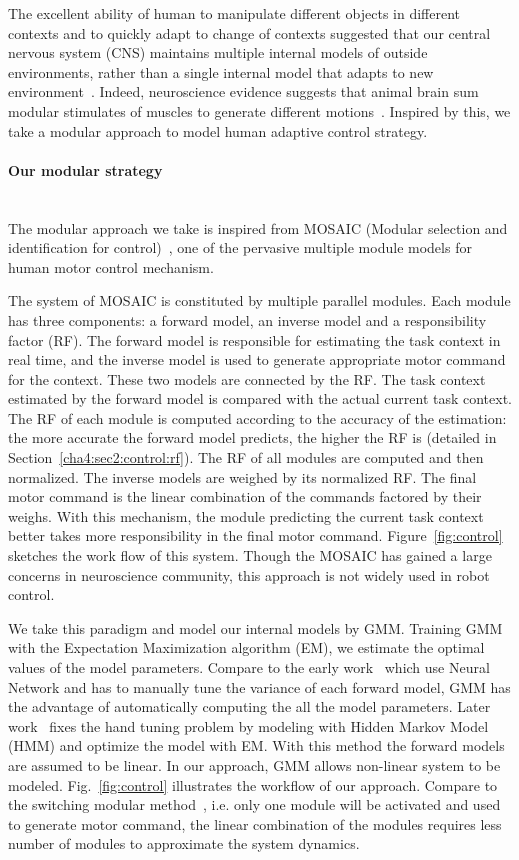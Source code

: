 The excellent ability of human to manipulate different objects in different contexts and to quickly adapt to change of contexts suggested that our central nervous system (CNS) maintains multiple internal models of outside environments, rather than a single internal model that adapts to new environment~\cite{neilson1985acquisition}. Indeed, neuroscience evidence suggests that animal brain sum modular stimulates of muscles to generate different motions~\cite{mussa1994linear}. Inspired by this, we take a modular approach to model human adaptive control strategy.



\paragraph{Our modular strategy} ~\\
The modular approach we take is inspired from MOSAIC (Modular selection and identification for control)~\cite{haruno2001mosaic}, one of the pervasive multiple module models for human motor control mechanism.

The system of MOSAIC is constituted by multiple parallel modules. Each module has three components: a forward model, an inverse model and a responsibility factor (RF). The forward model is responsible for estimating the task context in real time, and the inverse model is used to generate appropriate motor command for the context. These two models are connected by the RF. The task context estimated by the forward model is compared with the actual current task context.
The RF of each module is computed according to the accuracy of the estimation: the more accurate the forward model predicts, the higher the RF is (detailed in Section~\ref{cha4:sec2:control:rf}). The RF of all modules are computed and then normalized.
The inverse models are weighed by its normalized RF. The final motor command is the linear combination of the commands factored by their weighs. With this mechanism, the module predicting the current task context better takes more responsibility in the final motor command. Figure~\ref{fig:control} sketches the work flow of this system. Though the MOSAIC has gained a large concerns in neuroscience community, this approach is not widely used in robot control.

We take this paradigm and model our internal models by GMM. Training GMM with the Expectation Maximization algorithm (EM), we estimate the optimal values of the model parameters. Compare to the early work~\cite{wolpert1998multiple} which use Neural Network and has to manually tune the variance of each forward model, GMM has the advantage of automatically computing the all the model parameters. Later work~\cite{haruno2001mosaic} fixes the hand tuning problem by modeling with Hidden Markov Model (HMM) and optimize the model with EM. With this method the forward models are assumed to be linear. In our approach, GMM allows non-linear system to be modeled. Fig.~\ref{fig:control} illustrates the workflow of our approach. Compare to the switching modular method~\cite{narendra1997adaptive}, i.e. only one module will be activated and used to generate motor command, the linear combination of the modules requires less number of modules to approximate the system dynamics.

